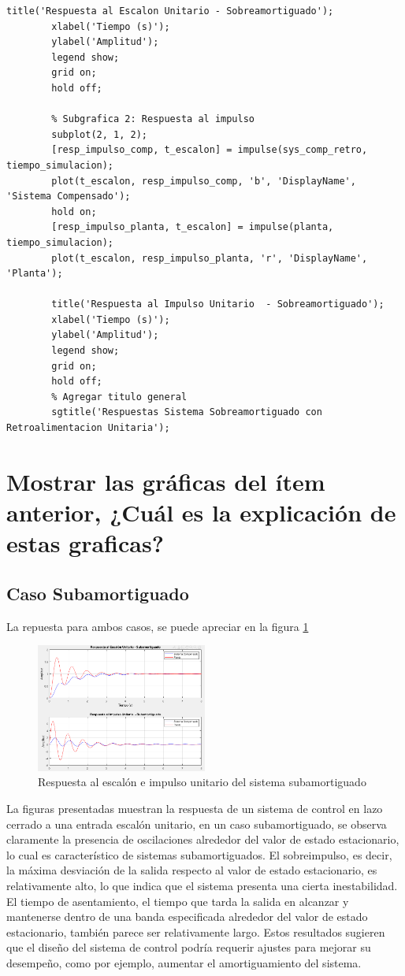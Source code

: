 \documentclass[conference]{IEEEtran}
\begin{document}
\begin{lstlisting}[numbers=none]
		title('Respuesta al Escalon Unitario - Sobreamortiguado');
		xlabel('Tiempo (s)');
		ylabel('Amplitud');
		legend show;
		grid on; 
		hold off;
		
		% Subgrafica 2: Respuesta al impulso 
		subplot(2, 1, 2); 
		[resp_impulso_comp, t_escalon] = impulse(sys_comp_retro, tiempo_simulacion);
		plot(t_escalon, resp_impulso_comp, 'b', 'DisplayName', 'Sistema Compensado');
		hold on;
		[resp_impulso_planta, t_escalon] = impulse(planta, tiempo_simulacion);
		plot(t_escalon, resp_impulso_planta, 'r', 'DisplayName', 'Planta');
		
		title('Respuesta al Impulso Unitario  - Sobreamortiguado');
		xlabel('Tiempo (s)');
		ylabel('Amplitud'); 
		legend show;
		grid on; 
		hold off;
		% Agregar titulo general 
		sgtitle('Respuestas Sistema Sobreamortiguado con Retroalimentacion Unitaria');
	\end{lstlisting}
	
	\section{Mostrar las gráficas del ítem anterior, ¿Cuál es la explicación de estas graficas?}
	
	\subsection{Caso Subamortiguado}
	La repuesta para ambos casos, se puede apreciar en la figura \ref{fig:respuesta-sub}
	
	\begin{figure}[h]
		\centering
		\includegraphics[width=0.5\textwidth]{media1/respuesta-sub}
		\caption{Respuesta al escalón e impulso unitario del sistema subamortiguado}
		\label{fig:respuesta-sub}
	\end{figure}
	
	La figuras presentadas muestran la respuesta de un sistema de control en lazo cerrado a una entrada escalón unitario, en un caso subamortiguado, se observa claramente la presencia de oscilaciones alrededor del valor de estado estacionario, lo cual es característico de sistemas subamortiguados. El sobreimpulso, es decir, la máxima desviación de la salida respecto al valor de estado estacionario, es relativamente alto, lo que indica que el sistema presenta una cierta inestabilidad. El tiempo de asentamiento, el tiempo que tarda la salida en alcanzar y mantenerse dentro de una banda especificada alrededor del valor de estado estacionario, también parece ser relativamente largo. Estos resultados sugieren que el diseño del sistema de control podría requerir ajustes para mejorar su desempeño, como por ejemplo, aumentar el amortiguamiento del sistema.
	
\end{document}
